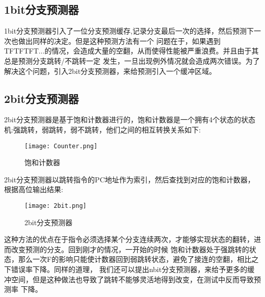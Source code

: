\documentclass[forprint]{WHUBachelor}
\begin{document}
  \subsection{1bit分支预测器}
1bit分支预测器引入了一位分支预测缓存,记录分支最后一次的选择，然后预测下一次也做出同样的决定。但是这种预测方法有一个
问题在于，如果遇到TFTFTFT...的情况，会造成大量的空翻，从而使得性能被严重浪费。并且由于其总是预测分支跳转/不跳转一定
发生，一旦出现例外情况就会造成两次错误。为了解决这个问题，引入2bit分支预测器，来给预测引入一个缓冲区域。

  
  
  
  \subsection{2bit分支预测器}
2bit分支预测器是基于饱和计数器进行的，饱和计数器是一个拥有4个状态的状态机:强跳转，弱跳转，弱不跳转，他们之间的相互转换关系如下:\par
\begin{figure}[ht]
  \centering
    \texttt{[image: Counter.png]}
    \caption{饱和计数器}
    \label{fig:1}
  \end{figure}
2bit分支预测器以跳转指令的PC地址作为索引，然后查找到对应的饱和计数器，根据高位输出结果:\par
\begin{figure}[ht]
  \centering
    \texttt{[image: 2bit.png]}
    \caption{2bit分支预测器}
    \label{fig:2}
  \end{figure}
这种方法的优点在于指令必须选择某个分支连续两次，才能够实现状态的翻转，进而改变预测的分支。回到刚才的情况，一开始的时候
饱和计数器处于强跳转的状态，那么一次F的影响只能使计数器回到弱跳转状态，避免了接连的空翻，相比之下错误率下降。同样的道理，
我们还可以提出nbit分支预测器，来给予更多的缓冲空间，但是这种做法也导致了跳转不能够灵活地得到改变，在测试中反而导致预测率
下降。
\end{document}
